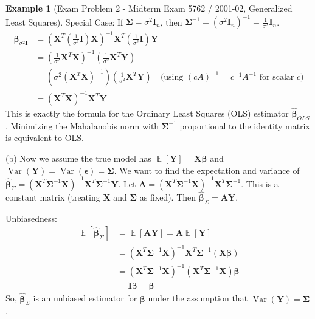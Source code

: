 \documentclass[11pt]{article}
\theoremstyle{definition}
\newtheorem{example}[theorem]{Example}
\theoremstyle{remark}
\DeclareMathOperator{\E}{\mathbb{E}}
\DeclareMathOperator{\Var}{\operatorname{Var}}
\begin{document}
\begin{example}[Exam Problem 2 - Midterm Exam 5762 / 2001-02, Generalized Least Squares]
Special Case: If $\bm{\Sigma} = \sigma^2 \bm{I}_n$, then $\bm{\Sigma}^{-1} = (\sigma^2 \bm{I}_n)^{-1} = \frac{1}{\sigma^2} \bm{I}_n$.
\begin{align*} \hat{\bm{\beta}}_{\sigma^2\bm{I}} &= (\bm{X}^T (\frac{1}{\sigma^2}\bm{I}) \bm{X})^{-1} \bm{X}^T (\frac{1}{\sigma^2}\bm{I}) \bm{Y} \\ &= (\frac{1}{\sigma^2} \bm{X}^T \bm{X})^{-1} (\frac{1}{\sigma^2} \bm{X}^T \bm{Y}) \\ &= (\sigma^2 (\bm{X}^T \bm{X})^{-1}) (\frac{1}{\sigma^2} \bm{X}^T \bm{Y}) \quad \text{(using } (cA)^{-1} = c^{-1}A^{-1} \text{ for scalar } c) \\ &= (\bm{X}^T \bm{X})^{-1} \bm{X}^T \bm{Y} \end{align*}
This is exactly the formula for the Ordinary Least Squares (OLS) estimator $\hat{\bm{\beta}}_{OLS}$. Minimizing the Mahalanobis norm with $\bm{\Sigma}^{-1}$ proportional to the identity matrix is equivalent to OLS.

(b) Now we assume the true model has $\E[\bm{Y}] = \bm{X}\bm{\beta}$ and $\Var(\bm{Y}) = \Var(\bm{\epsilon}) = \bm{\Sigma}$. We want to find the expectation and variance of $\hat{\bm{\beta}}_{\Sigma} = (\bm{X}^T \bm{\Sigma}^{-1} \bm{X})^{-1} \bm{X}^T \bm{\Sigma}^{-1} \bm{Y}$.
Let $\bm{A} = (\bm{X}^T \bm{\Sigma}^{-1} \bm{X})^{-1} \bm{X}^T \bm{\Sigma}^{-1}$. This is a constant matrix (treating $\bm{X}$ and $\bm{\Sigma}$ as fixed). Then $\hat{\bm{\beta}}_{\Sigma} = \bm{A}\bm{Y}$.

Unbiasedness:
\begin{align*} \E[\hat{\bm{\beta}}_{\Sigma}] &= \E[\bm{A}\bm{Y}] = \bm{A} \E[\bm{Y}] \\ &= (\bm{X}^T \bm{\Sigma}^{-1} \bm{X})^{-1} \bm{X}^T \bm{\Sigma}^{-1} (\bm{X}\bm{\beta}) \\ &= (\bm{X}^T \bm{\Sigma}^{-1} \bm{X})^{-1} (\bm{X}^T \bm{\Sigma}^{-1} \bm{X}) \bm{\beta} \\ &= \bm{I} \bm{\beta} = \bm{\beta} \end{align*}
So, $\hat{\bm{\beta}}_{\Sigma}$ is an unbiased estimator for $\bm{\beta}$ under the assumption that $\Var(\bm{Y}) = \bm{\Sigma}$.


\end{example}
\end{document}

